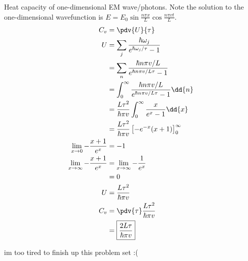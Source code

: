\documentclass[newpage]{homework}
\begin{document}
\question
Heat capacity of one-dimensional EM wave/photons. Note the solution to the one-dimensional wavefunction is $E = E_0 \sin{\frac{n\pi x}{L}}\cos{\frac{n\pi vt}{L}}$.
\begin{align*}
    C_v	&=	\pdv{U}{\tau}	\\
    U   &=  \sum_j \frac{\hbar \omega_j}{e^{\hbar \omega_j / \tau} - 1} \\
        &=  \sum_n \frac{\hbar n \pi v/L}{e^{\hbar n \pi v/L\tau} - 1}  \\
        &=  \int_0^\infty \frac{\hbar n \pi v/L}{e^{\hbar n \pi v/L\tau} - 1} \dd{n}    \\
        &=	\frac{L\tau^2}{\hbar\pi v} \int_0^\infty \frac{x}{e^x - 1} \dd{x}	\\
        &=  \frac{L\tau^2}{\hbar\pi v} \left[-e^{-x}(x+1)\right]_0^\infty   \\
    \lim_{x\to0} -\frac{x+1}{e^x}   &=  -1   \\
    \lim_{x\to\infty} -\frac{x+1}{e^x}   &=  \lim_{x\to\infty} -\frac{1}{e^x} \\
    &=  0  \\
    U   &=  \frac{L\tau^2}{\hbar\pi v}  \\
    C_v &=  \pdv{\tau} \frac{L\tau^2}{\hbar\pi v}   \\
        &=  \boxed{\frac{2L\tau}{\hbar\pi v}}
\end{align*}


im too tired to finish up this problem set :(
\end{document}
